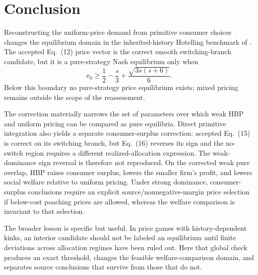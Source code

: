 \section{Conclusion}
\label{sec:conclusion}

Reconstructing the uniform-price demand from primitive consumer choices changes the equilibrium domain in the inherited-history Hotelling benchmark of \citet{GehrigShyStenbacka2012}. The accepted Eq.~(12) price vector is the correct smooth switching-branch candidate, but it is a pure-strategy Nash equilibrium only when
\[
x_0\ge
\frac12-\frac{s}{3}
+\frac{\sqrt{3s(s+6)}}6.
\]
Below this boundary no pure-strategy price equilibrium exists; mixed pricing remains outside the scope of the reassessment.

The correction materially narrows the set of parameters over which weak HBP and uniform pricing can be compared as pure equilibria. Direct primitive integration also yields a separate consumer-surplus correction: accepted Eq.~(15) is correct on its switching branch, but Eq.~(16) reverses its sign and the no-switch region requires a different realized-allocation expression. The weak-dominance sign reversal is therefore not reproduced. On the corrected weak pure overlap, HBP raises consumer surplus, lowers the smaller firm's profit, and lowers social welfare relative to uniform pricing. Under strong dominance, consumer-surplus conclusions require an explicit source/nonnegative-margin price selection if below-cost poaching prices are allowed, whereas the welfare comparison is invariant to that selection.

The broader lesson is specific but useful. In price games with history-dependent kinks, an interior candidate should not be labeled an equilibrium until finite deviations across allocation regimes have been ruled out. Here that global check produces an exact threshold, changes the feasible welfare-comparison domain, and separates source conclusions that survive from those that do not.
